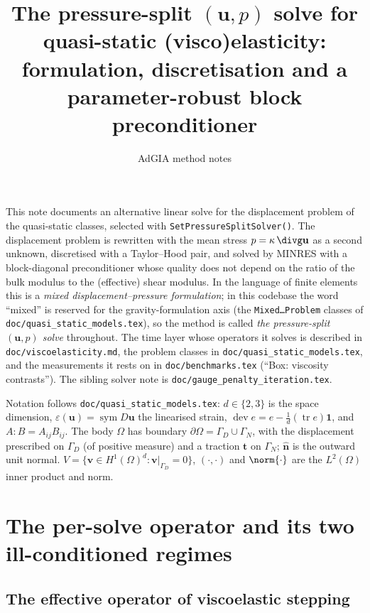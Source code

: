 \documentclass[11pt]{article}
\title{The pressure-split $(\mathbf{u}, p)$ solve for quasi-static
       (visco)elasticity:\\ formulation, discretisation and a
       parameter-robust block preconditioner}
\author{AdGIA method notes}
\date{}
\numberwithin{equation}{section}
\theoremstyle{remark}
\newcommand{\eps}{\varepsilon}
\newcommand{\tr}{\operatorname{tr}}
\newcommand{\sym}{\operatorname{sym}}
\newcommand{\dev}{\operatorname{dev}}
\newcommand{\vu}{\mathbf{u}}
\newcommand{\vv}{\mathbf{v}}
\newcommand{\vn}{\hat{\mathbf{n}}}
\newcommand{\vt}{\mathbf{t}}
\newcommand{\one}{\mathbf{1}}
\newcommand{\code}[1]{\texttt{#1}}
\begin{document}
\maketitle

\noindent
This note documents an alternative linear solve for the displacement
problem of the quasi-static classes, selected with
\code{SetPressureSplitSolver()}. The displacement problem is rewritten
with the mean stress $p = \kappa\,\divg\vu$ as a second unknown,
discretised with a Taylor--Hood pair, and solved by MINRES with a
block-diagonal preconditioner whose quality does not depend on the ratio
of the bulk modulus to the (effective) shear modulus. In the language of
finite elements this is a \emph{mixed displacement--pressure
formulation}; in this codebase the word ``mixed'' is reserved for the
gravity-formulation axis (the \code{Mixed\ldots Problem} classes of
\code{doc/quasi\_static\_models.tex}), so the method is called \emph{the
pressure-split $(\vu, p)$ solve} throughout. The time layer whose
operators it solves is described in \code{doc/viscoelasticity.md}, the
problem classes in \code{doc/quasi\_static\_models.tex}, and the
measurements it rests on in \code{doc/benchmarks.tex} (``Box: viscosity
contrasts''). The sibling solver note is
\code{doc/gauge\_penalty\_iteration.tex}.

Notation follows \code{doc/quasi\_static\_models.tex}: $d \in \{2,3\}$
is the space dimension, $\eps(\vu) = \sym D\vu$ the linearised strain,
$\dev e = e - \frac1d (\tr e)\one$, and $A:B = A_{ij}B_{ij}$. The body
$\Omega$ has boundary $\partial\Omega = \Gamma_D \cup \Gamma_N$, with the
displacement prescribed on $\Gamma_D$ (of positive measure) and a traction
$\vt$ on $\Gamma_N$; $\vn$ is the outward unit normal. $V = \{\vv \in
H^1(\Omega)^d : \vv|_{\Gamma_D} = 0\}$, $(\cdot,\cdot)$ and
$\norm{\cdot}$ are the $L^2(\Omega)$ inner product and norm.

\tableofcontents

\section{The per-solve operator and its two ill-conditioned regimes}
\label{sec:setting}

\subsection{The effective operator of viscoelastic stepping}
\label{sec:beta}
\end{document}
